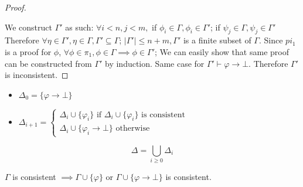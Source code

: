 \documentclass{article}
\newtheorem{definition}[theorem]{Definition}
\let\olddefinition\definition
\let\endolddefinition\enddefinition
\renewenvironment{definition}
  {\begin{tcolorbox}[
      colback=red!10,
      colframe=red!50!black,
      boxrule=0.6pt,
      arc=2pt,
      left=6pt,right=6pt,top=4pt,bottom=4pt,
      breakable
    ]\olddefinition}
  {\endolddefinition\end{tcolorbox}}
\newtheorem{lemma}[theorem]{Lemma}
\let\oldlemma\lemma
\let\endoldlemma\endlemma
\renewenvironment{lemma}
  {\begin{tcolorbox}[
      colback=green!8,
      colframe=green!50!black,
      boxrule=0.6pt,
      arc=2pt,
      left=6pt,right=6pt,top=4pt,bottom=4pt
    ]\oldlemma}
  {\endoldlemma\end{tcolorbox}}
\begin{document}
\begin{itemize}
\begin{proof}
\begin{itemize}
        \end{itemize}
        We construct $\Gamma'$ as such: $\forall i < n, j < m, $ if $\phi_i \in \Gamma, \phi_i \in \Gamma'$; if $\psi_j \in \Gamma, \psi_j \in \Gamma'$ 
        Therefore $\forall \eta \in \Gamma', \eta \in \Gamma, \Gamma' \subseteq \Gamma$; $|\Gamma'| \leq n + m, \Gamma'$ is a finite subset of $\Gamma$.
        Since $pi_1$ is a proof for $\phi$, $\forall \phi \in \pi_1, \phi \in \Gamma \implies \phi \in \Gamma'$; We can easily show that same proof can be 
        constructed from $\Gamma'$ by induction. Same case for $\Gamma'\vdash \varphi \rightarrow \bot$. Therefore $\Gamma'$ is inconsistent.       
    \end{proof}
\end{itemize}
\begin{definition}
    \begin{itemize}
        \item $\Delta_0 = \{\varphi \rightarrow \bot\}$
        \item $\Delta_{i+1} = \begin{cases}
            \Delta_i \cup \{\varphi_i\} \text{ if } \Delta_i \cup \{\varphi_i\} \text{ is consistent}\\
            \Delta_i \cup \{\varphi_i \rightarrow \bot\} \text{ otherwise}
        \end{cases}$
    \end{itemize}
    \[\Delta = \bigcup_{i\geq 0} \Delta_i\]
\end{definition}
\begin{lemma}
    $\Gamma$ is consistent $\implies \Gamma \cup \{\varphi\}$ or $\Gamma \cup \{\varphi \rightarrow \bot\}$ is consistent.
\end{lemma}
\end{document}

